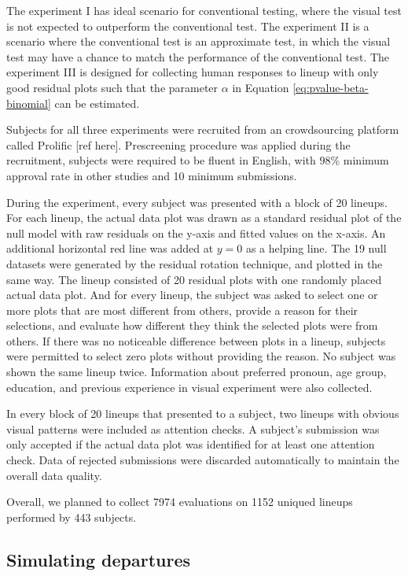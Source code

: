 \documentclass[]{interact}
\theoremstyle{plain}%
\theoremstyle{definition}
\theoremstyle{remark}
\begin{document}
The experiment I has ideal scenario for conventional testing, where the
visual test is not expected to outperform the conventional test. The
experiment II is a scenario where the conventional test is an
approximate test, in which the visual test may have a chance to match
the performance of the conventional test. The experiment III is designed
for collecting human responses to lineup with only good residual plots
such that the parameter \(\alpha\) in Equation
\ref{eq:pvalue-beta-binomial} can be estimated.

Subjects for all three experiments were recruited from an crowdsourcing
platform called Prolific {[}ref here{]}. Prescreening procedure was
applied during the recruitment, subjects were required to be fluent in
English, with \(98\%\) minimum approval rate in other studies and 10
minimum submissions.

During the experiment, every subject was presented with a block of 20
lineups. For each lineup, the actual data plot was drawn as a standard
residual plot of the null model with raw residuals on the y-axis and
fitted values on the x-axis. An additional horizontal red line was added
at \(y = 0\) as a helping line. The 19 null datasets were generated by
the residual rotation technique, and plotted in the same way. The lineup
consisted of 20 residual plots with one randomly placed actual data
plot. And for every lineup, the subject was asked to select one or more
plots that are most different from others, provide a reason for their
selections, and evaluate how different they think the selected plots
were from others. If there was no noticeable difference between plots in
a lineup, subjects were permitted to select zero plots without providing
the reason. No subject was shown the same lineup twice. Information
about preferred pronoun, age group, education, and previous experience
in visual experiment were also collected.

In every block of 20 lineups that presented to a subject, two lineups
with obvious visual patterns were included as attention checks. A
subject's submission was only accepted if the actual data plot was
identified for at least one attention check. Data of rejected
submissions were discarded automatically to maintain the overall data
quality.

Overall, we planned to collect 7974 evaluations on 1152 uniqued lineups
performed by 443 subjects.

\hypertarget{simulating-departures}{%
\subsection{Simulating departures}\label{simulating-departures}}
\end{document}
